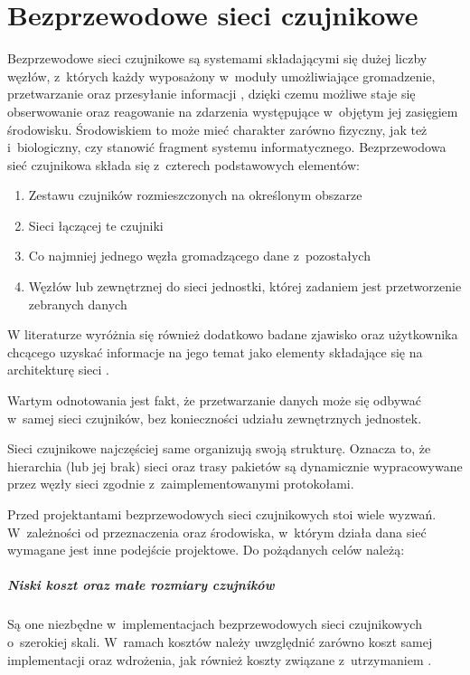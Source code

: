 \chapter{Bezprzewodowe sieci czujnikowe}
Bezprzewodowe sieci czujnikowe są systemami składającymi się dużej liczby węzłów, z~których każdy wyposażony w~moduły umożliwiające gromadzenie, przetwarzanie oraz przesyłanie informacji \cite{Ilyas2004}, dzięki czemu możliwe staje się obserwowanie oraz reagowanie na zdarzenia występujące w~objętym jej zasięgiem środowisku. Środowiskiem to może mieć charakter zarówno fizyczny, jak też i~biologiczny, czy stanowić fragment systemu informatycznego. 
\cite{Sohraby2006}
Bezprzewodowa sieć czujnikowa składa się z~czterech podstawowych elementów\cite{Karl2006}:
\begin{enumerate}
	\item Zestawu czujników rozmieszczonych na określonym obszarze
	\item Sieci łączącej te czujniki
	\item Co najmniej jednego węzła gromadzącego dane z~pozostałych
	\item Węzłów lub zewnętrznej do sieci jednostki, której zadaniem jest przetworzenie zebranych danych
\end{enumerate}
W literaturze wyróżnia się również dodatkowo badane zjawisko oraz użytkownika chcącego uzyskać informacje na jego temat jako elementy składające się na architekturę sieci \cite{Tilak2002}.

Wartym odnotowania jest fakt, że przetwarzanie danych może się odbywać w~samej sieci czujników, bez konieczności udziału zewnętrznych jednostek.

Sieci czujnikowe najczęściej same organizują swoją strukturę. Oznacza to, że hierarchia (lub jej brak) sieci oraz trasy pakietów są dynamicznie wypracowywane przez węzły sieci zgodnie z~zaimplementowanymi protokołami.

Przed projektantami bezprzewodowych sieci czujnikowych stoi wiele wyzwań. W~zależności od przeznaczenia oraz środowiska, w~którym działa dana sieć wymagane jest inne podejście projektowe. Do pożądanych celów należą:
\paragraph{Niski koszt oraz małe rozmiary czujników}
Są one niezbędne w~implementacjach bezprzewodowych sieci czujnikowych o~szerokiej skali. W~ramach kosztów należy uwzględnić zarówno koszt samej implementacji oraz wdrożenia, jak również koszty związane z~utrzymaniem \cite{Howitt2006}.

